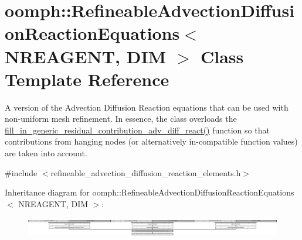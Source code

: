 \hypertarget{classoomph_1_1RefineableAdvectionDiffusionReactionEquations}{}\section{oomph\+:\+:Refineable\+Advection\+Diffusion\+Reaction\+Equations$<$ N\+R\+E\+A\+G\+E\+NT, D\+IM $>$ Class Template Reference}
\label{classoomph_1_1RefineableAdvectionDiffusionReactionEquations}


A version of the Advection Diffusion Reaction equations that can be used with non-\/uniform mesh refinement. In essence, the class overloads the \hyperlink{classoomph_1_1RefineableAdvectionDiffusionReactionEquations_ac00be5fb705024129d006f2ed2d80eab}{fill\+\_\+in\+\_\+generic\+\_\+residual\+\_\+contribution\+\_\+adv\+\_\+diff\+\_\+react()} function so that contributions from hanging nodes (or alternatively in-\/compatible function values) are taken into account.  




{\ttfamily \#include $<$refineable\+\_\+advection\+\_\+diffusion\+\_\+reaction\+\_\+elements.\+h$>$}

Inheritance diagram for oomph\+:\+:Refineable\+Advection\+Diffusion\+Reaction\+Equations$<$ N\+R\+E\+A\+G\+E\+NT, D\+IM $>$\+:\begin{figure}[H]
\begin{center}
\leavevmode
\includegraphics[height=0.875547cm]{classoomph_1_1RefineableAdvectionDiffusionReactionEquations}
\end{center}
\end{figure}

